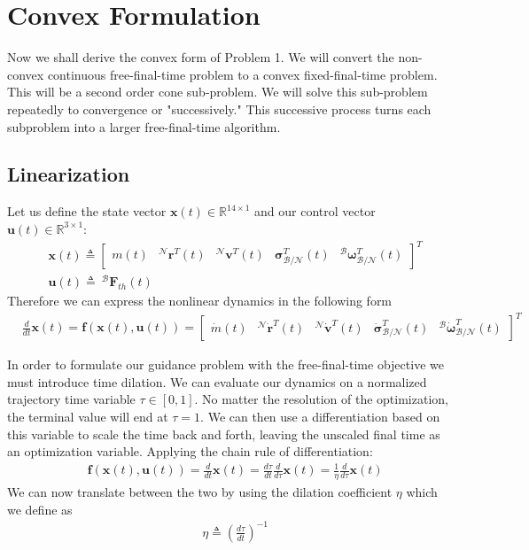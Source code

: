\chapter{Convex Formulation}
\label{convex}

Now we shall derive the convex form of Problem 1. We will convert the non-convex continuous free-final-time problem to a convex fixed-final-time problem. This will be a second order cone sub-problem. We will solve this sub-problem repeatedly to convergence or "successively." This successive process turns each subproblem into a larger free-final-time algorithm.

\section{Linearization}
Let us define the state vector $\mathbf{x}(t) \in \mathbb{R}^{14\times 1}$ and our control vector $\mathbf{u}(t) \in \mathbb{R}^{3\times 1}$:
\begin{align}
& \mathbf{x}(t) \triangleq 
	\begin{bmatrix}
	m(t) & ^\mathcal{N}\mathbf{r}^T(t) & ^\mathcal{N}\mathbf{v}^T(t) & \boldsymbol{\sigma}_\mathcal{B/N}^T(t) & ^\mathcal{B}\bm{\omega}_\mathcal{B/N}^T(t)   
	\end{bmatrix}^T \\
& \mathbf{u}(t) \triangleq \ ^\mathcal{B}\mathbf{F}_{th}(t)  
\end{align}
Therefore we can express the nonlinear dynamics in the following form
\begin{align}
& \frac{d}{dt}\mathbf{x}(t) = \mathbf{f}(\mathbf{x}(t), \mathbf{u}(t)) =  
	\begin{bmatrix}
	\dot{m}(t) & ^\mathcal{N}\dot{\mathbf{r}}^T(t) & ^\mathcal{N}\dot{\mathbf{v}}^T(t) & \dot{\boldsymbol{\sigma}}_\mathcal{B/N}^T(t) & ^\mathcal{B}\dot{\bm{\omega}}_\mathcal{B/N}^T(t)  
	\end{bmatrix}^T
\end{align}

In order to formulate our guidance problem with the free-final-time objective we must introduce time dilation. We can evaluate our dynamics on a normalized trajectory time variable $\tau \in [0,1]$. No matter the resolution of the optimization, the terminal value will end at $\tau = 1$. We can then use a differentiation based on this variable to scale the time back and forth, leaving the unscaled final time as an optimization variable. Applying the chain rule of differentiation: 
\begin{align}
& \mathbf{f}(\mathbf{x}(t) , \mathbf{u}(t)) =  \frac{d}{dt}\mathbf{x}(t) = \frac{d\tau}{dt} \frac{d}{d\tau}\mathbf{x}(t) =  \frac{1}{\eta}\frac{d}{d\tau}\mathbf{x}(t)
\end{align}
We can now translate between the two by using the dilation coefficient $\eta$ which we define as
\begin{align}
& \eta \triangleq \left(\frac{d\tau}{dt}\right)^{-1}
\end{align}

